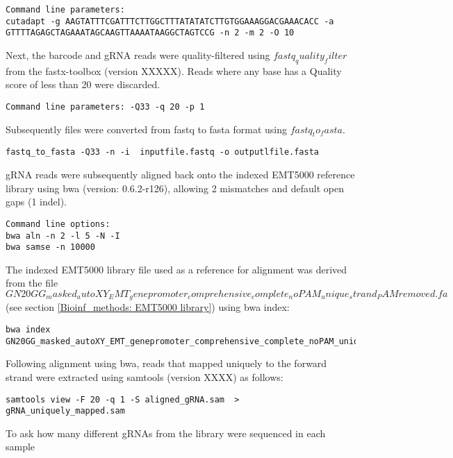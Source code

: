 \begin{footnotesize}
\begin{lstlisting}
Command line parameters:
cutadapt -g AAGTATTTCGATTTCTTGGCTTTATATATCTTGTGGAAAGGACGAAACACC -a GTTTTAGAGCTAGAAATAGCAAGTTAAAATAAGGCTAGTCCG -n 2 -m 2 -O 10
\end{lstlisting}

Next, the barcode and gRNA reads were quality-filtered using $fastq_quality_filter$ from the fastx-toolbox (version XXXXX). Reads where any base has a Quality score of less than 20 were discarded. 

\begin{lstlisting}
Command line parameters: -Q33 -q 20 -p 1 
\end{lstlisting}

Subsequently files were converted from fastq to fasta format using $fastq_to_fasta$. 

\begin{lstlisting}
fastq_to_fasta -Q33 -n -i  inputfile.fastq -o outputlfile.fasta
\end{lstlisting}

gRNA reads were subsequently aligned back onto the indexed EMT5000 reference library using bwa (version: 0.6.2-r126), allowing 2 mismatches and default open gaps (1 indel).

\begin{lstlisting}
Command line options:
bwa aln -n 2 -l 5 -N -I  
bwa samse -n 10000 
\end{lstlisting}


The indexed EMT5000 library file used as a reference for alignment was derived from the file $GN20GG_masked_autoXY_EMT_genepromoter_comprehensive_complete_noPAM_unique_strand_PAMremoved.fa $ (see section \ref{Bioinf_methods: EMT5000 library}) using bwa index:

\begin{lstlisting}
bwa index GN20GG_masked_autoXY_EMT_genepromoter_comprehensive_complete_noPAM_unique_strand_PAMremoved.fa
\end{lstlisting}


Following alignment using bwa, reads that mapped uniquely to the forward strand were extracted using samtools (version XXXX) as follows:

\begin{lstlisting}
samtools view -F 20 -q 1 -S aligned_gRNA.sam  > gRNA_uniquely_mapped.sam
\end{lstlisting}


To ask how many different gRNAs from the library were sequenced in each sample


\end{footnotesize}
